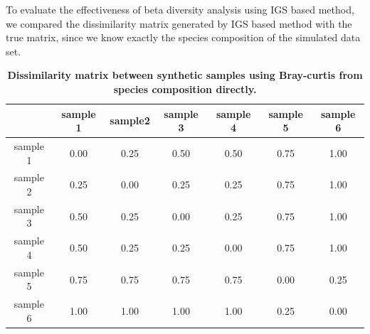 To evaluate the effectiveness of beta diversity analysis using IGS based method, 
we compared the dissimilarity matrix generated by IGS based method with the 
true matrix, since we know exactly the species composition of the 
simulated data set.


\begin{table}[!ht]
\centering
\begin{tabular}{|c|c|c|c|c|c|c|}
\hline
                  & sample 1 & sample2 & sample 3 & sample 4 & sample 5 & sample 6 \\ \hline
sample 1 & 0.00              & 0.25             & 0.50              & 0.50              & 0.75              & 1.00              \\ 
sample 2 & 0.25              & 0.00             & 0.25              & 0.25              & 0.75              & 1.00              \\ 
sample 3 & 0.50              & 0.25             & 0.00              & 0.25              & 0.75              & 1.00              \\ 
sample 4 & 0.50              & 0.25             & 0.25              & 0.00              & 0.75              & 1.00              \\ 
sample 5 & 0.75              & 0.75             & 0.75              & 0.75              & 0.00              & 0.25              \\ 
sample 6 & 1.00              & 1.00             & 1.00              & 1.00              & 0.25              & 0.00              \\ \hline
\end{tabular}
\caption{\bf Dissimilarity matrix between synthetic samples using Bray-curtis
from species composition directly. }
\label{table:simulated_real_matrix}
\end{table}

